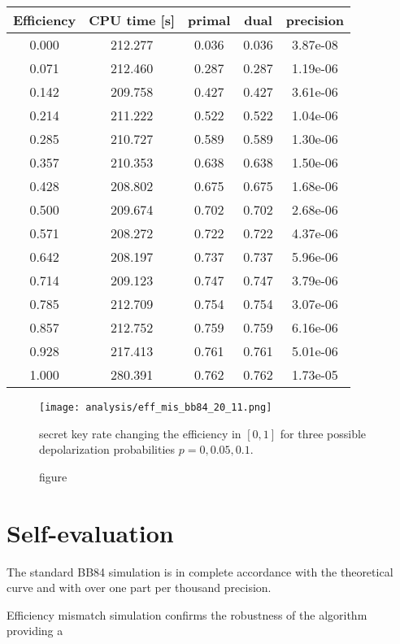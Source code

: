 \documentclass{article}
\begin{document}
 \begin{minipage}{\linewidth}
    \centering
    \begin{tabular}{c|c|c|c|c}
        Efficiency & CPU time [s]& primal& dual& precision\\
        \hline
        0.000 & 212.277 & 0.036 & 0.036 & 3.87e-08 \\
        0.071 & 212.460 & 0.287 & 0.287 & 1.19e-06 \\
        0.142 & 209.758 & 0.427 & 0.427 & 3.61e-06 \\
        0.214 & 211.222 & 0.522 & 0.522 & 1.04e-06 \\
        0.285 & 210.727 & 0.589 & 0.589 & 1.30e-06 \\
        0.357 & 210.353 & 0.638 & 0.638 & 1.50e-06 \\
        0.428 & 208.802 & 0.675 & 0.675 & 1.68e-06 \\
        0.500 & 209.674 & 0.702 & 0.702 & 2.68e-06 \\
        0.571 & 208.272 & 0.722 & 0.722 & 4.37e-06 \\
        0.642 & 208.197 & 0.737 & 0.737 & 5.96e-06 \\
        0.714 & 209.123 & 0.747 & 0.747 & 3.79e-06 \\
        0.785 & 212.709 & 0.754 & 0.754 & 3.07e-06 \\
        0.857 & 212.752 & 0.759 & 0.759 & 6.16e-06 \\
        0.928 & 217.413 & 0.761 & 0.761 & 5.01e-06 \\
        1.000 & 280.391 & 0.762 & 0.762 & 1.73e-05 \\ 
        \hline
    \end{tabular}
    \label{tbl:p-01}
\end{minipage}
 \begin{figure}
     \centering
     \texttt{[image: analysis/eff\_mis\_bb84\_20\_11.png]}
     \caption{figure}{secret key rate changing the efficiency in \([0,1]\) for three possible depolarization probabilities \(p=0,0.05,0.1\).}
 \end{figure}


\section{Self-evaluation}
The standard BB84 simulation is in complete accordance with the theoretical curve and with over one part per thousand precision.

Efficiency mismatch simulation confirms the robustness of the algorithm providing a 


\end{document}
